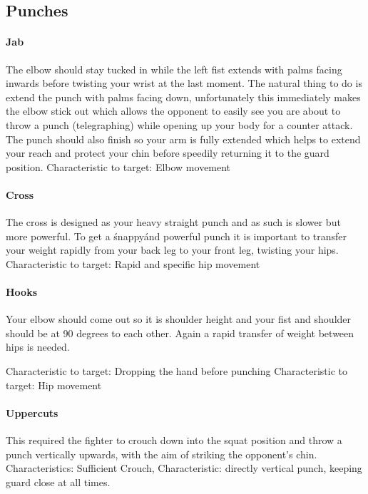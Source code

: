 \subsection{Punches}
\label{subsec:subsec03}
\paragraph{Jab}
The elbow should stay tucked in while the left fist extends with palms facing inwards before twisting your wrist at the last moment. The natural thing to do is extend the punch with palms facing down, unfortunately this immediately makes the elbow stick out which allows the opponent to easily see you are about to throw a punch (telegraphing) while opening up your body for a counter attack.
The punch should also finish so your arm is fully extended which helps to extend your reach and protect your chin before speedily returning it to the guard position.
Characteristic to target: Elbow movement

\paragraph{Cross}
The cross is designed as your heavy straight punch and as such is slower but more powerful. To get a \'snappy\' and powerful punch it is important to transfer your weight rapidly from your back leg to your front leg, twisting your hips. 
Characteristic to target: Rapid and specific hip movement


\paragraph{Hooks}
Your elbow should come out so it is shoulder height and your fist and shoulder should be at 90 degrees to each other. Again a rapid transfer of weight between hips is needed.  

Characteristic to target: Dropping the hand before punching
Characteristic to target: Hip movement

\paragraph{Uppercuts}
This required the fighter to crouch down into the squat position and throw a punch vertically upwards, with the aim of striking the opponent's chin.
Characteristics: Sufficient Crouch, 
Characteristic: directly vertical punch, keeping guard close at all times.


